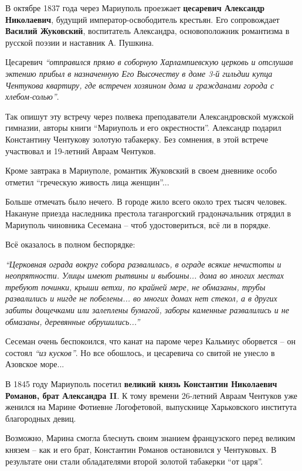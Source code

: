 В октябре 1837 года через Мариуполь проезжает \textbf{цесаревич Александр Николаевич},
будущий император-освободитель крестьян. Его сопровождает \textbf{Василий Жуковский},
воспитатель Александра, основоположник романтизма в русской поэзии и наставник
А. Пушкина.

Цесаревич \emph{\enquote{отправился прямо в соборную Харлампиевскую церковь и отслушав
эктению прибыл в назначенную Его Высочеству в доме 3-й гильдии купца Чентукова
квартиру, где встречен хозяином дома и гражданами города с хлебом-солью}}.

Так опишут эту встречу через полвека преподаватели Александровской мужской
гимназии, авторы книги \enquote{Мариуполь и его окрестности}. Александр подарил
Константину Чентукову золотую табакерку. Без сомнения, в этой встрече
участвовал и 19-летний Авраам Чентуков.

Кроме завтрака в Мариуполе, романтик Жуковский в своем дневнике особо отметил
\enquote{греческую живость лица женщин}...

Больше отмечать было нечего. В городе жило всего около трех тысяч человек.
Накануне приезда наследника престола таганрогский градоначальник отрядил в
Мариуполь чиновника Сесемана – чтоб удостовериться, всё ли в порядке.

Всё оказалось в полном беспорядке:

\begin{leftbar}
\em\enquote{Церковная ограда вокруг собора развалилась, в ограде всякие нечистоты и
неопрятности. Улицы имеют рытвины и выбоины... дома во многих местах требуют
починки, крыши ветхи, по крайней мере, не обмазаны, трубы развалились и нигде
не побелены... во многих домах нет стекол, а в других забиты дощечками или
залеплены бумагой, заборы каменные развалились и не обмазаны, деревянные
обрушились...}
\end{leftbar}

Сесеман очень беспокоился, что канат на пароме через Кальмиус оборвется – он
состоял \emph{\enquote{из кусков}}. Но все обошлось, и цесаревича со свитой не унесло в
Азовское море...

В 1845 году Мариуполь посетил \textbf{великий князь Константин Николаевич Романов, брат
Александра II}. К тому времени 26-летний Авраам Чентуков уже женился на Марине
Фотиевне Логофетовой, выпускнице Харьковского института благородных девиц.

Возможно, Марина смогла блеснуть своим знанием французского перед великим
князем – как и его брат, Константин Романов остановился у Чентуковых. В
результате они стали обладателями второй золотой табакерки \enquote{от царя}.

